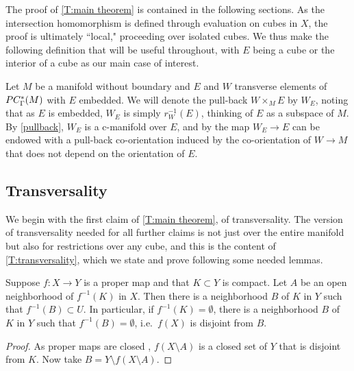 \bigskip

The proof of \cref{T:main theorem} is contained in the following sections.
As the intersection homomorphism is defined through evaluation on cubes in $X$, the proof is ultimately ``local," proceeding over isolated cubes.
We thus make the following definition that will be useful throughout, with $E$ being a cube or the interior of a cube as our main case of interest.

\begin{definition}
	Let $M$ be a manifold without boundary and $E$ and $W$ transverse elements of $PC^*_\Gamma(M)$ with $E$ embedded.
	We will denote the pull-back $W \times_M E$ by $W_E$, noting that as $E$ is embedded, $W_E$ is simply $r_W^{-1}(E)$, thinking of $E$ as a subspace of $M$.
	By \cref{pullback}, $W_E$ is a c-manifold over $E$, and by \cite[Sections 3.5.1 and 3.5.2]{medina2022foundations} the map $W_E\to E$ can be endowed with a pull-back co-orientation induced by the co-orientation of $W\to M$ that does not depend on the orientation of $E$.
\end{definition}

\subsection{Transversality}

We begin with the first claim of \cref{T:main theorem}, of transversality.
The version of transversality needed for all further claims
is not just over the entire manifold but also for restrictions over any cube, and this is the content of \cref{T:transversality}, which we state and prove following some needed lemmas.

\begin{lemma}\label{L:proper ngbd}
	Suppose $f \colon X \to Y$ is a proper map and that $K \subset Y$ is compact.
	Let $A$ be an open neighborhood of $f^{-1}(K)$ in $X$.
	Then there is a neighborhood $B$ of $K$ in $Y$ such that $f^{-1}(B) \subset U$.
	In particular, if $f^{-1}(K) = \emptyset$, there is a neighborhood $B$ of $K$ in $Y$ such that $f^{-1}(B) = \emptyset$, i.e.\ $f(X)$ is disjoint from $B$.
\end{lemma}
\begin{proof}
	As proper maps are closed \cite[Proposition I.10.1.1]{Bou98}, $f(X \setminus A)$ is a closed set of $Y$ that is disjoint from $K$.
	Now take $B = Y \setminus f(X \setminus A)$.
\end{proof}


